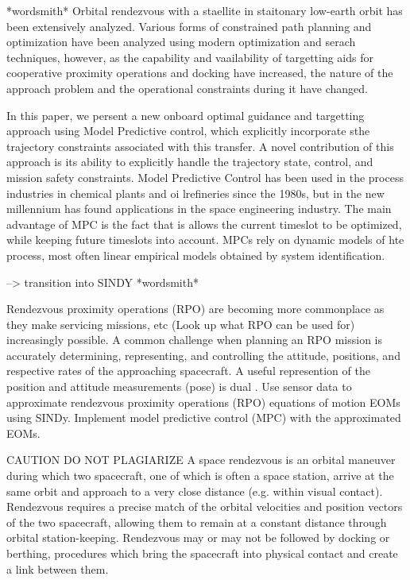 \documentclass[letterpaper, preprint, paper,11pt]{AAS}	%
\begin{document}
*wordsmith* 
Orbital rendezvous with a staellite in staitonary low-earth orbit has been extensively analyzed. Various forms of constrained path planning and optimization have been analyzed using modern optimization and serach techniques, however, as the capability and vaailability of targetting aids for cooperative proximity operations and docking have increased, the nature of the approach problem and the operational constraints during it have changed. 

In this paper, we persent a new onboard optimal guidance and targetting approach using Model Predictive control, which explicitly incorporate sthe trajectory constraints associated with this transfer. A novel contribution of this approach is its ability to explicitly handle the trajectory state, control, and mission safety constraints. Model Predictive Control has been used in the process industries in chemical plants and oi lrefineries since the 1980s, but in the new millennium has found applications in the space engineering industry. The main advantage of MPC is the fact that is allows the current timeslot to be optimized, while keeping future timeslots into account. MPCs rely on dynamic models of hte process, most often linear empirical models obtained by system identification. 

--> transition into SINDY
*wordsmith* 

Rendezvous proximity operations (RPO) are becoming more commonplace as they make servicing missions, etc (Look up what RPO can be used for) increasingly possible. A common challenge when planning an RPO mission is accurately determining, representing, and controlling the attitude, positions, and respective rates of the approaching spacecraft. A useful represention of the position and attitude measurements (pose) is dual . Use sensor data to approximate rendezvous proximity operations (RPO) equations of motion EOMs using SINDy. Implement model predictive control (MPC) with the approximated EOMs.

CAUTION DO NOT PLAGIARIZE
A space rendezvous is an orbital maneuver during which two spacecraft, one of which is often a space station, arrive at the same orbit and approach to a very close distance (e.g. within visual contact). Rendezvous requires a precise match of the orbital velocities and position vectors of the two spacecraft, allowing them to remain at a constant distance through orbital station-keeping. Rendezvous may or may not be followed by docking or berthing, procedures which bring the spacecraft into physical contact and create a link between them.
\end{document}
